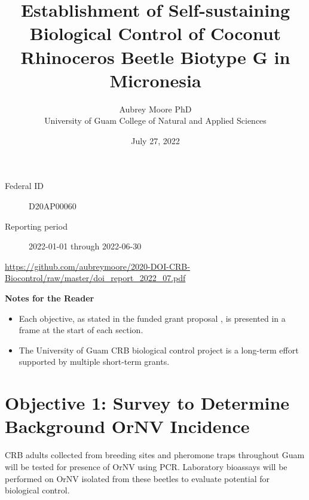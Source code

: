 \documentclass[12pt,letterpaper,english,bibliography=totocnumbered, abstract=on]{scrartcl}
\begin{document}
\titlehead{Progress Report: DOI-OIA Coral Reef and Natural Resources Initiative FY2020}

\title{Establishment of Self-sustaining Biological Control of Coconut Rhinoceros Beetle Biotype G in Micronesia }

\author{Aubrey Moore PhD\\University of Guam College of Natural and Applied Sciences}

\date{July 27, 2022}

\maketitle

\begin{description}
	\item[Federal ID] D20AP00060
	\item[Reporting period] 2022-01-01 through 2022-06-30
\end{description}


\begin{footnotesize}
	\url{https://github.com/aubreymoore/2020-DOI-CRB-Biocontrol/raw/master/doi_report_2022_07.pdf}
\end{footnotesize}

\clearpage

\tableofcontents

\clearpage


\textbf{Notes for the Reader}

\begin{itemize}

\item Each objective, as stated in the funded grant proposal \cite{mooreGrantProposalDOIOIA2020}, is presented in a frame at the start of each section. 

\item The University of Guam CRB biological control project is a long-term effort supported by multiple short-term grants.  

\end{itemize}



\clearpage
\section{Objective 1: Survey to Determine Background OrNV Incidence} 

\begin{framed}
CRB adults collected from breeding sites and pheromone traps throughout Guam will be tested for presence of OrNV using PCR.  Laboratory bioassays will be performed on OrNV isolated from these beetles to evaluate potential for biological control.
\end{framed} 
\end{document}
